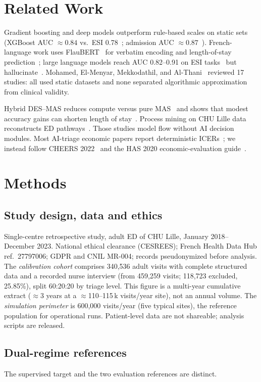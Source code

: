 \documentclass[conference]{IEEEtran}
\begin{document}
\section{Related Work}
Gradient boosting and deep models outperform rule-based scales on static sets (XGBoost AUC $\approx0.84$ vs.\ ESI 0.78~\cite{levin2018}; admission AUC $\approx0.87$~\cite{hong2018}). French-language work uses FlauBERT~\cite{le2020flaubert} for verbatim encoding and length-of-stay prediction~\cite{chrusciel2021}; large language models reach AUC 0.82--0.91 on ESI tasks~\cite{kilic2024} but hallucinate~\cite{ji2023}. Mohamed, El-Menyar, Mekkodathil, and Al-Thani~\cite{mohamed2024} reviewed 17 studies: all used static datasets and none separated algorithmic approximation from clinical validity.

Hybrid DES--MAS reduces compute versus pure MAS~\cite{liu2025,moyaux2023} and shows that modest accuracy gains can shorten length of stay~\cite{zgaya2014,ajmi2019}. Process mining on CHU Lille data reconstructs ED pathways~\cite{lelay2024}. Those studies model flow without AI decision modules. Most AI-triage economic papers report deterministic ICERs~\cite{levin2018,mohamed2024}; we instead follow CHEERS 2022~\cite{husereau2022} and the HAS 2020 economic-evaluation guide~\cite{has2020}.

\section{Methods}

\subsection{Study design, data and ethics}
Single-centre retrospective study, adult ED of CHU Lille, January 2018--December 2023. National ethical clearance (CESREES); French Health Data Hub ref.\ 27797006; GDPR and CNIL MR-004; records pseudonymized before analysis. The \emph{calibration cohort} comprises 340,536 adult visits with complete structured data and a recorded nurse interview (from 459,259 visits; 118,723 excluded, 25.85\%), split 60:20:20 by triage level. This figure is a multi-year cumulative extract ($\approx3$ years at a $\approx$110--115\,k visits/year site), not an annual volume. The \emph{simulation perimeter} is 600,000 visits/year (five typical sites), the reference population for operational runs. Patient-level data are not shareable; analysis scripts are released.

\subsection{Dual-regime references}
The supervised target and the two evaluation references are distinct.
\end{document}
